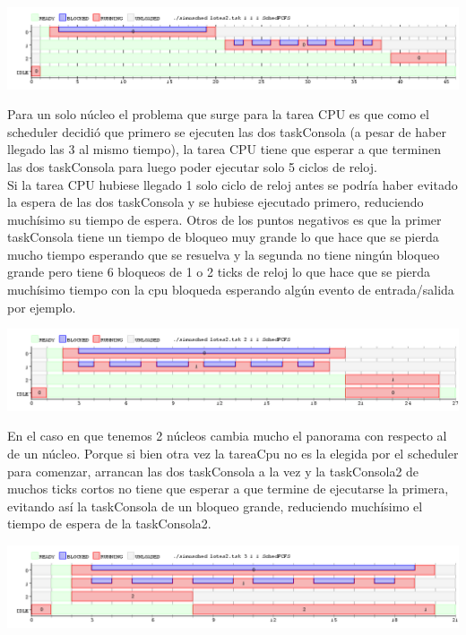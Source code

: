 \begin{center}
\includegraphics[scale=0.4]{graficos/imagen1.png}
\end{center}

Para un solo núcleo el problema que surge para la tarea CPU es que como el scheduler decidió que primero se ejecuten las dos taskConsola (a pesar de haber llegado las 3 al mismo tiempo), la tarea CPU tiene que esperar a que terminen las dos taskConsola para luego poder ejecutar solo 5 ciclos de reloj. \\

Si la tarea CPU hubiese llegado 1 solo ciclo de reloj antes se podría haber evitado la espera de las dos taskConsola y se hubiese ejecutado primero, reduciendo muchísimo su tiempo de espera. 
Otros de los puntos negativos es que la primer taskConsola tiene un tiempo de bloqueo muy grande lo que hace que se pierda mucho tiempo esperando que se resuelva y la segunda no tiene ningún bloqueo grande pero tiene 6 bloqueos de 1 o 2 ticks de reloj lo que hace que se pierda muchísimo tiempo con la cpu bloqueda esperando algún evento de entrada/salida por ejemplo. \\

\begin{center}
\includegraphics[scale=0.4]{graficos/imagen2.png}
\end{center}

En el caso en que tenemos 2 núcleos cambia mucho el panorama con respecto al de un núcleo.
Porque si bien otra vez la tareaCpu no es la elegida por el scheduler para comenzar, arrancan las dos taskConsola a la vez y la taskConsola2 de muchos ticks cortos no tiene que esperar a que termine de ejecutarse la primera, evitando así la taskConsola de un bloqueo grande, reduciendo muchísimo el tiempo de espera de la taskConsola2.\\

\begin{center}
\includegraphics[scale=0.4]{graficos/imagen3.png}
\end{center}

